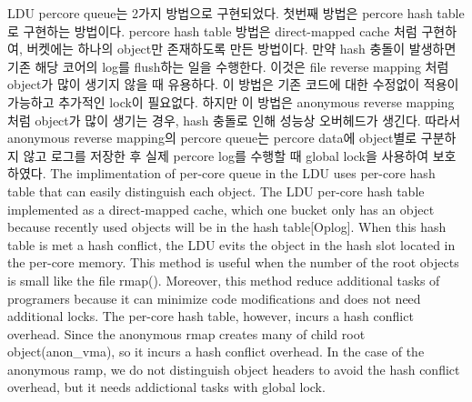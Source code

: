 \ifkor
LDU percore queue는 2가지 방법으로 구현되었다. 
첫번째 방법은 percore hash table로 구현하는 방법이다.
percore hash table 방법은 direct-mapped cache 처럼 구현하여, 버켓에는 하나의 object만 존재하도록
만든 방법이다. 
만약 hash 충돌이 발생하면 기존 해당 코어의 log를 flush하는 일을 수행한다.
이것은 file reverse mapping 처럼 object가 많이 생기지 않을 때 유용하다. 
이 방법은 기존 코드에 대한 수정없이 적용이 가능하고 추가적인 lock이 필요없다.
하지만 이 방법은 anonymous reverse mapping 처럼 object가 많이 생기는 경우, hash 충돌로 인해 
성능상 오버헤드가 생긴다. 
따라서 anonymous reverse mapping의 percore queue는 percore data에 object별로
구분하지 않고 로그를 저장한 후 실제 percore log를 수행할 때 global lock을 사용하여 보호하였다. 
\else
The implimentation of per-core queue in the LDU uses per-core hash table that 
can easily distinguish each object.
The LDU per-core hash table implemented as a direct-mapped cache, which one
bucket only has an object because recently used objects will be in the hash
table[Oplog].
When this hash table is met a hash conflict, the LDU evits the object in the
hash slot located in the per-core memory.
This method is useful when the number of the root objects is small like the file
rmap().
Moreover, this method reduce additional tasks of programers because it can
minimize code modifications and does not need additional locks.
The per-core hash table, however, incurs a hash conflict overhead.
Since the anonymous rmap creates many of child root object(anon\_vma), so it
incurs a hash conflict overhead.
In the case of the anonymous ramp, we do not distinguish object headers to
avoid the hash conflict overhead, but it needs addictional tasks with global
lock.
\fi

